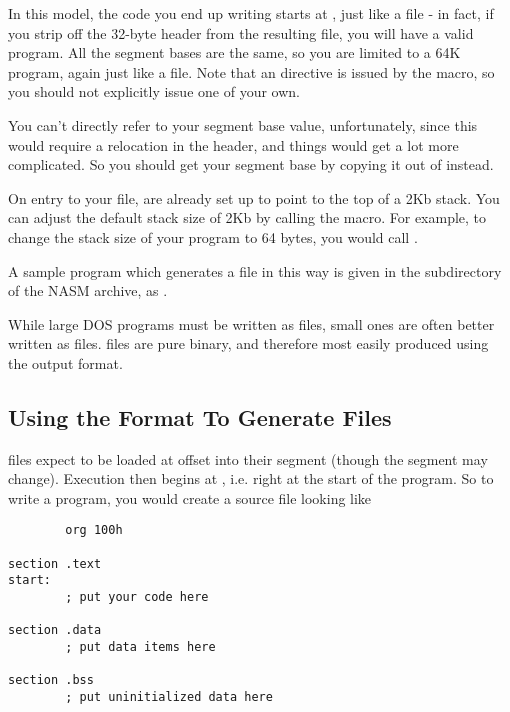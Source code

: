 In this model, the code you end up writing starts at , just
like a  file - in fact, if you strip off the 32-byte header
from the resulting  file, you will have a valid 
program. All the segment bases are the same, so you are limited to a
64K program, again just like a  file. Note that an 
directive is issued by the  macro, so you should not
explicitly issue one of your own.

You can't directly refer to your segment base value, unfortunately,
since this would require a relocation in the header, and things
would get a lot more complicated. So you should get your segment
base by copying it out of  instead.

On entry to your  file,  are already set up to
point to the top of a 2Kb stack. You can adjust the default stack
size of 2Kb by calling the  macro. For example, to
change the stack size of your program to 64 bytes, you would call
.

A sample program which generates a  file in this way is
given in the  subdirectory of the NASM archive, as
.


While large DOS programs must be written as  files, small
ones are often better written as  files.  files are
pure binary, and therefore most easily produced using the 
output format.

\subsection{Using the  Format To Generate  Files}
\label{subsec:combinfmt}

 files expect to be loaded at offset  into their
segment (though the segment may change). Execution then begins at
, i.e. right at the start of the program.
So to write a  program, you would create a source file
looking like

\begin{lstlisting}
        org 100h

section .text
start:
        ; put your code here

section .data
        ; put data items here

section .bss
        ; put uninitialized data here
\end{lstlisting}

